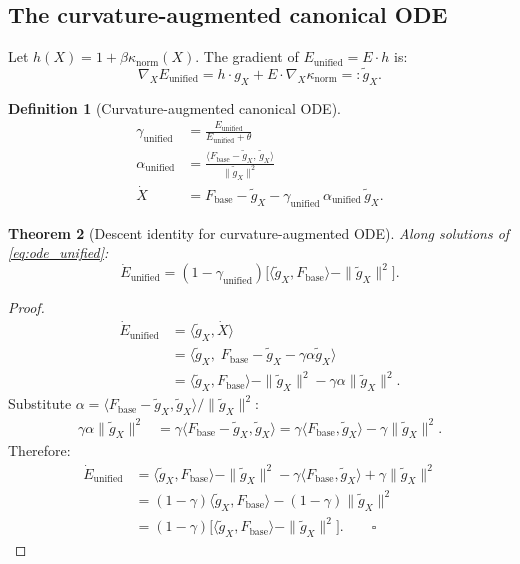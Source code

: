 \documentclass[11pt,a4paper]{article}
\newtheorem{theorem}{Theorem}[section]
\theoremstyle{definition}
\newtheorem{definition}[theorem]{Definition}
\newcommand{\Fbase}{F_{\mathrm{base}}}
\begin{document}
\subsection{The curvature-augmented canonical ODE}

Let $h(X) = 1 + \beta\kappa_\mathrm{norm}(X)$.
The gradient of $E_\mathrm{unified} = E\cdot h$ is:
\begin{equation}
\label{eq:grad_unified}
\nabla_X E_\mathrm{unified} = h\cdot g_X + E\cdot\nabla_X\kappa_\mathrm{norm}
=: \tilde g_X.
\end{equation}

\begin{definition}[Curvature-augmented canonical ODE]
\label{def:ode_unified}
\begin{align}
\gamma_\mathrm{unified} &= \frac{E_\mathrm{unified}}{E_\mathrm{unified}+\theta}
\label{eq:gamma_unified}\\
\alpha_\mathrm{unified} &= \frac{\langle\Fbase - \tilde g_X,\,\tilde g_X\rangle}
{\|\tilde g_X\|^2}
\label{eq:alpha_unified}\\
\dot X &= \Fbase - \tilde g_X - \gamma_\mathrm{unified}\,\alpha_\mathrm{unified}\,\tilde g_X.
\label{eq:ode_unified}
\end{align}
\end{definition}

\begin{theorem}[Descent identity for curvature-augmented ODE]
\label{thm:descent_unified}
Along solutions of \eqref{eq:ode_unified}:
\[
\dot E_\mathrm{unified} = (1-\gamma_\mathrm{unified})
\bigl[\langle\tilde g_X,\Fbase\rangle - \|\tilde g_X\|^2\bigr].
\]
\end{theorem}

\begin{proof}
\begin{align*}
\dot E_\mathrm{unified}
&= \langle\tilde g_X, \dot X\rangle \\
&= \langle\tilde g_X,\;\Fbase - \tilde g_X - \gamma\alpha\tilde g_X\rangle \\
&= \langle\tilde g_X,\Fbase\rangle - \|\tilde g_X\|^2 - \gamma\alpha\|\tilde g_X\|^2.
\end{align*}
Substitute $\alpha = \langle\Fbase-\tilde g_X,\tilde g_X\rangle/\|\tilde g_X\|^2$:
\begin{align*}
\gamma\alpha\|\tilde g_X\|^2
&= \gamma\langle\Fbase-\tilde g_X,\tilde g_X\rangle
= \gamma\langle\Fbase,\tilde g_X\rangle - \gamma\|\tilde g_X\|^2.
\end{align*}
Therefore:
\begin{align*}
\dot E_\mathrm{unified}
&= \langle\tilde g_X,\Fbase\rangle - \|\tilde g_X\|^2
  - \gamma\langle\Fbase,\tilde g_X\rangle + \gamma\|\tilde g_X\|^2 \\
&= (1-\gamma)\langle\tilde g_X,\Fbase\rangle - (1-\gamma)\|\tilde g_X\|^2 \\
&= (1-\gamma)\bigl[\langle\tilde g_X,\Fbase\rangle - \|\tilde g_X\|^2\bigr]. \qquad\square
\end{align*}
\end{proof}
\end{document}
